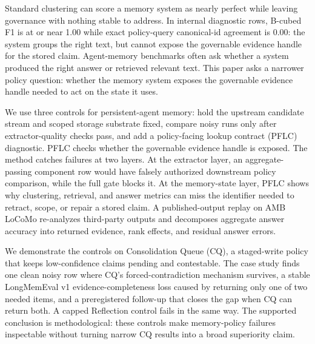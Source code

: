 Standard clustering can score a memory system as nearly perfect while leaving
governance with nothing stable to address. In internal diagnostic rows, B-cubed
F1 is at or near 1.00 while exact policy-query canonical-id agreement is 0.00:
the system groups the right text, but cannot expose the governable evidence
handle for the stored claim. Agent-memory benchmarks often ask whether a
system produced the right answer or retrieved relevant text. This paper asks a
narrower policy question: whether the memory system exposes the governable
evidence handle needed to act on the state it uses.

We use three controls for persistent-agent memory: hold the upstream candidate
stream and scoped storage substrate fixed, compare noisy runs only after
extractor-quality checks pass, and add a policy-facing lookup contract (PFLC)
diagnostic. PFLC checks whether the governable evidence handle is exposed. The
method catches failures at two layers. At the extractor layer, an
aggregate-passing component row would have falsely authorized downstream policy
comparison, while the full gate blocks it. At the memory-state layer, PFLC
shows why clustering, retrieval, and answer metrics can miss the identifier
needed to retract, scope, or repair a stored claim. A published-output replay
on AMB LoCoMo re-analyzes third-party outputs and decomposes aggregate answer
accuracy into returned evidence, rank effects, and residual answer errors.

We demonstrate the controls on Consolidation Queue (CQ), a staged-write policy
that keeps low-confidence claims pending and contestable. The case study finds
one clean noisy row where CQ's forced-contradiction mechanism survives, a
stable LongMemEval v1 evidence-completeness loss caused by returning only one
of two needed items, and a preregistered follow-up that closes the gap when CQ
can return both. A capped Reflection control fails in the same way. The
supported conclusion is methodological: these controls make memory-policy
failures inspectable without turning narrow CQ results into a broad
superiority claim.
